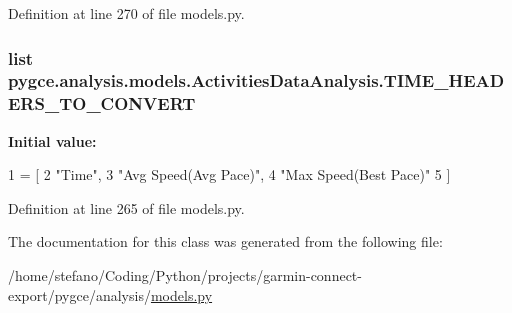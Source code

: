 Definition at line 270 of file models.\+py.

\subsubsection[{\texorpdfstring{T\+I\+M\+E\+\_\+\+H\+E\+A\+D\+E\+R\+S\+\_\+\+T\+O\+\_\+\+C\+O\+N\+V\+E\+RT}{TIME_HEADERS_TO_CONVERT}}]{\setlength{\rightskip}{0pt plus 5cm}list pygce.\+analysis.\+models.\+Activities\+Data\+Analysis.\+T\+I\+M\+E\+\_\+\+H\+E\+A\+D\+E\+R\+S\+\_\+\+T\+O\+\_\+\+C\+O\+N\+V\+E\+RT\hspace{0.3cm}{\ttfamily [static]}}\hypertarget{classpygce_1_1analysis_1_1models_1_1_activities_data_analysis_a2f0ccc7899b8c6b6d94391c80f5def1d}{}\label{classpygce_1_1analysis_1_1models_1_1_activities_data_analysis_a2f0ccc7899b8c6b6d94391c80f5def1d}
{\bfseries Initial value\+:}
\begin{DoxyCode}
1 = [
2         \textcolor{stringliteral}{"Time"},
3         \textcolor{stringliteral}{"Avg Speed(Avg Pace)"},
4         \textcolor{stringliteral}{"Max Speed(Best Pace)"}
5     ]
\end{DoxyCode}


Definition at line 265 of file models.\+py.



The documentation for this class was generated from the following file\+:\begin{DoxyCompactItemize}
\item 
/home/stefano/\+Coding/\+Python/projects/garmin-\/connect-\/export/pygce/analysis/\hyperlink{models_8py}{models.\+py}\end{DoxyCompactItemize}
